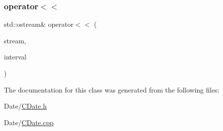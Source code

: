 \mbox{\label{class_c_date_a4414c2f98725d7b2865080c5edc7ab62}} 
\subsubsection{\texorpdfstring{operator$<$$<$}{operator<<}\hspace{0.1cm}{\footnotesize\ttfamily [2/2]}}
{\footnotesize\ttfamily std\+::ostream\& operator$<$$<$ (\begin{DoxyParamCaption}\item[{std\+::ostream \&}]{stream,  }\item[{const \mbox{\hyperlink{class_c_date_af23472c977b14ed341b48183ec19d874}{C\+Date\+::\+Interval}} \&}]{interval }\end{DoxyParamCaption})\hspace{0.3cm}{\ttfamily [friend]}}



The documentation for this class was generated from the following files\+:\begin{DoxyCompactItemize}
\item 
Date/\mbox{\hyperlink{_c_date_8h}{C\+Date.\+h}}\item 
Date/\mbox{\hyperlink{_c_date_8cpp}{C\+Date.\+cpp}}\end{DoxyCompactItemize}
